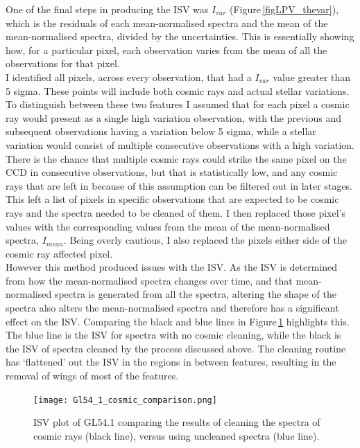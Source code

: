 One of the final steps in producing the ISV was $I_{var}$ (Figure\,\ref{figLPV_thevar}), which is the residuals of each mean-normalised spectra and the mean of the mean-normalised spectra, divided by the uncertainties. This is essentially showing how, for a particular pixel, each observation varies from the mean of all the observations for that pixel.\\

I identified all pixels, across every observation, that had a $I_{var}$ value greater than 5 sigma. These points will include both cosmic rays and actual stellar variations. To distinguish between these two features I assumed that for each pixel a cosmic ray would present as a single high variation observation, with the previous and subsequent observations having a variation below 5 sigma, while a stellar variation would consist of multiple consecutive observations with a high variation. There is the chance that multiple cosmic rays could strike the same pixel on the CCD in consecutive observations, but that is statistically low, and any cosmic rays that are left in because of this assumption can be filtered out in later stages.\\

This left a list of pixels in specific observations that are expected to be cosmic rays and the spectra needed to be cleaned of them. I then replaced those pixel's values with the corresponding values from the mean of the mean-normalised spectra, $I_{mean}$. Being overly cautious, I also replaced the pixels either side of the cosmic ray affected pixel.\\

However this method produced issues with the ISV. As the ISV is determined from how the mean-normalised spectra changes over time, and that mean-normalised spectra is generated from all the spectra, altering the shape of the spectra also alters the mean-normalised spectra and therefore has a significant effect on the ISV. Comparing the black and blue lines in Figure\,\ref{figGL54.1_cosmic_comparison} highlights this. The blue line is the ISV for spectra with no cosmic cleaning, while the black is the ISV of spectra cleaned by the process discussed above. The cleaning routine has `flattened' out the ISV in the regions in between features, resulting in the removal of wings of most of the features.\\

\begin{figure}
	\centering
	\captionsetup{width=.8\textwidth}
    \texttt{[image: Gl54\_1\_cosmic\_comparison.png]}
    \caption{ISV plot of GL54.1 comparing the results of cleaning the spectra of cosmic rays (black line), versus using uncleaned spectra (blue line).}
    \label{figGL54.1_cosmic_comparison}
\end{figure}

